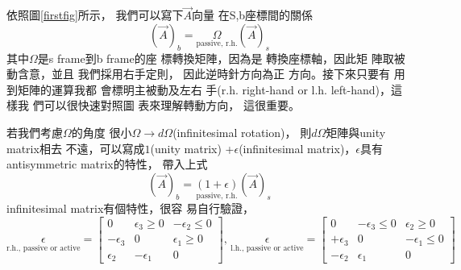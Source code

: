 \documentclass[12pt,twoside]{article}
\begin{document}
\bigskip 依照圖\ref{firstfig}所示，%
我們可以寫下$\vec{A}$向量%
在S,b座標間的關係%
\begin{equation*}
\left( \vec{A}\right) _{b}=\underset{\text{passive, r.h.}}{\Omega }\left( 
\vec{A}\right) _{s}
\end{equation*}%
其中$\Omega $是s frame到b frame的座%
標轉換矩陣，因為是%
轉換座標軸，因此矩%
陣取被動含意，並且%
我們採用右手定則，%
因此逆時針方向為正%
方向。接下來只要有%
用到矩陣的運算我都%
會標明主被動及左右%
手(r.h. right-hand or l.h. left-hand)，這樣我%
們可以很快速對照圖%
表來理解轉動方向，%
這很重要。

若我們考慮$\Omega $的角度%
很小$\Omega \rightarrow d\Omega $(infinitesimal rotation)，%
則$d\Omega $矩陣與unity matrix相去%
不遠，可以寫成$1$(unity matrix) +$%
\epsilon $(infinitesimal matrix)，$\epsilon $具有%
antisymmetric matrix的特性\cite[p. 169]{goldstein}，%
帶入上式%
\begin{equation*}
\left( \vec{A}\right) _{b}=\underset{\text{passive, r.h.}}{\left( 1+\epsilon
\right) }\left( \vec{A}\right) _{s}
\end{equation*}%
infinitesimal matrix有個特性，很容%
易自行驗證，%
\begin{equation*}
\underset{\text{r.h., passive or active}}{\epsilon }=\left[ 
\begin{array}{ccc}
0 & \epsilon _{3}\geq 0 & -\epsilon _{2}\leq 0 \\ 
-\epsilon _{3} & 0 & \epsilon _{1}\geq 0 \\ 
\epsilon _{2} & -\epsilon _{1} & 0%
\end{array}%
\right] \text{, }\underset{\text{l.h., passive or active}}{\epsilon }=\left[ 
\begin{array}{ccc}
0 & -\epsilon _{3}\leq 0 & \epsilon _{2}\geq 0 \\ 
+\epsilon _{3} & 0 & -\epsilon _{1}\leq 0 \\ 
-\epsilon _{2} & \epsilon _{1} & 0%
\end{array}%
\right]
\end{equation*}
\end{document}
